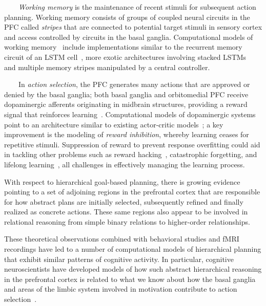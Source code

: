 \documentclass[letterpaper,11pt]{article}
\begin{document}
\begin{center}
\begin{tcolorbox}[breakable,sharp corners=all,coltitle=black,colbacktitle=white,
    width=\textwidth,boxsep=5pt,left=5pt,right=5pt,
    title={\textbf{Box C: Hierarchy, Abstraction and Executive Control}}]
~~~~{\it{Working memory}} is the maintenance of recent stimuli for subsequent action planning. Working memory consists of groups of coupled neural circuits in the PFC called {\it{stripes}} that are connected to potential target stimuli in sensory cortex and access controlled by circuits in the basal ganglia. Computational models of working memory~\cite{HazyetalPTRS-07} include implementations similar to the recurrent memory circuit of an LSTM cell~\cite{HochreiterandSchmidhuberNC-97}, more exotic architectures involving stacked LSTMs~\cite{graves2013speech} and multiple memory stripes manipulated by a central controller.

~~~~In {\it{action selection}}, the PFC generates many actions that are approved or denied by the basal ganglia; both basal ganglia and orbitomedial PFC receive dopaminergic afferents originating in midbrain structures, providing a reward signal that reinforces learning~\cite{FusterPREFRONTAL-CORTEX-15}. Computational models of dopaminergic systems~\cite{o2007pvlv} point to an architecture similar to existing actor-critic models~\cite{MnihetalCoRR-16}; a key improvement is the modeling of {\it{reward inhibition}}, whereby learning ceases for repetitive stimuli. Suppression of reward to prevent response overfitting could aid in tackling other problems such as reward hacking~\cite{amodei2016concrete}, catastrophic forgetting, and lifelong learning~\cite{ZhiyuanandBingLML-18}, all challenges in effectively managing the learning process.

  \end{tcolorbox}
\end{center}


With respect to hierarchical goal-based planning, there is growing evidence pointing to a set of adjoining regions in the prefrontal cortex that are responsible for how abstract plans are initially selected, subsequently refined and finally realized as concrete actions. These same regions also appear to be involved in relational reasoning from simple binary relations to higher-order relationships.

These theoretical observations combined with behavioral studies and fMRI recordings have led to a number of computational models of hierarchical planning that exhibit similar patterns of cognitive activity. In particular, cognitive neuroscientists have developed models of how such abstract hierarchical reasoning in the prefrontal cortex is related to what we know about how the basal ganglia and areas of the limbic system involved in motivation contribute to action selection~\cite{OReillySCIENCE-06}. 
\end{document}
